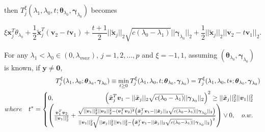 then $T^\xi_j(\lambda_1,\lambda_0,t;\boldsymbol\theta_{\lambda_0},\boldsymbol\gamma_{\lambda_0})$ becomes

\begin{equation}
    \label{eq:txi.alt}
    \xi\boldsymbol x_j^T\theta_{\lambda_0}+\frac{1}{2} \tilde{\boldsymbol x}_j^T(\boldsymbol v_2-t \boldsymbol v_1)+\frac{t+1}{2}||\tilde{\boldsymbol x}_j||_2\sqrt{c(\lambda_0-\lambda_1)}||\boldsymbol\gamma_{\lambda_0}||_2+\frac{1}{2}||\tilde{\boldsymbol x}_j||_2||\boldsymbol v_2-t\boldsymbol v_1||_2.
\end{equation}

\begin{theorem}
    \label{thm:2.4}
    For any $\lambda_1<\lambda_{0}\in (0,\lambda_{max})$, $j=1,2,...,p$ and $\xi=-1,1$, assuming $(\boldsymbol\theta_{\lambda_0},\boldsymbol\gamma_{\lambda_0})$ is known, if $\boldsymbol y\neq \boldsymbol 0$,
    \begin{gather}
        \begin{aligned}
            T^\xi_j(\lambda_1,\lambda_0;\boldsymbol\theta_{\lambda_0},\boldsymbol\gamma_{\lambda_0})\equiv\underset{t\geq 0}{\mathrm{min}}\,T^\xi_j(\lambda_1,\lambda_0,t;\boldsymbol\theta_{\lambda_0},\boldsymbol\gamma_{\lambda_0})=T^\xi_j(\lambda_1,\lambda_0,t*;\boldsymbol\theta_{\lambda_0},\boldsymbol\gamma_{\lambda_0})\\
            where\quad t^*=\begin{cases}
            0,\hfill \left(\tilde{\boldsymbol x}_j^T\boldsymbol v_1-||\tilde{\boldsymbol x}_j||_2\sqrt{c(\lambda_0-\lambda_1)}||\boldsymbol\gamma_{\lambda_0}||_2\right)^2\geq ||\tilde{\boldsymbol x}_j||^2_2||\boldsymbol v_1||^2_2\\
            \left(\frac{\boldsymbol v_1^T\boldsymbol v_2}{||\boldsymbol v_1||_2^2}+\frac{\sqrt{||\boldsymbol v_1||_2^2||\boldsymbol v_2||_2^2-(\boldsymbol v_1^T\boldsymbol v_2)^2}\left(\tilde{\boldsymbol x}_j^T\boldsymbol v_1-||\tilde{\boldsymbol x}_j||_2\sqrt{c(\lambda_0-\lambda_1)}||\boldsymbol\gamma_{\lambda_0}||_2\right)}{||\boldsymbol v_1||_2^2\sqrt{||\boldsymbol x_j||_2^2||\boldsymbol v_1||_2^2-\left(\tilde{\boldsymbol x}_j^T\boldsymbol v_1-||\tilde{\boldsymbol x}_j||_2\sqrt{c(\lambda_0-\lambda_1)}||\boldsymbol\gamma_{\lambda_0}||_2\right)^2}}\right)\vee 0,\hfill\quad o.w.
            \end{cases}
        \end{aligned}
    \end{gather}
\end{theorem}

